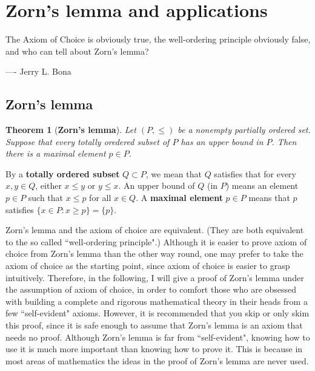 \documentclass[12pt,b5paper,notitlepage]{article}
\theoremstyle{definition}
\theoremstyle{plain}
\newtheorem{thm}[df]{Theorem}
\numberwithin{equation}{section}
\begin{document}
\newpage




\section{Zorn's lemma and applications}\label{lb512}


\begin{displayquote}
\small The Axiom of Choice is obviously true, the well-ordering principle obviously false, and who can tell about Zorn's lemma?

\hfill ---- Jerry L. Bona
\end{displayquote}



\subsection{Zorn's lemma}



\begin{thm}[\textbf{Zorn's lemma}]
Let $(P,\leq)$ be a nonempty partially ordered set. Suppose that every totally oredered subset of $P$ has an upper bound in $P$. Then there is a maximal element $p\in P$.
\end{thm}


By a \textbf{totally ordered subset}  $Q\subset P$, we mean that $Q$ satisfies that for every $x,y\in Q$, either $x\leq y$ or $y\leq x$. An upper bound of $Q$ (in $P$) means an element $p\in P$ such that $x\leq p$ for all $x\in Q$. A \textbf{maximal element}  $p\in P$ means that $p$ satisfies $\{x\in P:x\geq p\}=\{p\}$.


Zorn's lemma and the axiom of choice are equivalent. (They are both equivalent to the so called ``well-ordering principle".) Although it is easier to prove axiom of choice from Zorn's lemma than the other way round, one may prefer to take the axiom of choice as the starting point, since axiom of choice is easier to grasp intuitively. Therefore, in the following, I will give a proof of Zorn's lemma under the assumption of axiom of choice, in order to comfort those who are obsessed with building a complete and rigorous mathematical theory in their heads from a few ``self-evident" axioms. However, it is recommended that you skip or only skim this proof, since it is safe enough to assume that Zorn's lemma is an axiom that needs no proof. Although Zorn's lemma is far from ``self-evident", knowing how to use it is much more important than knowing how to prove it. This is because in most areas of mathematics the ideas in the proof of Zorn's lemma are never used.
\end{document}
